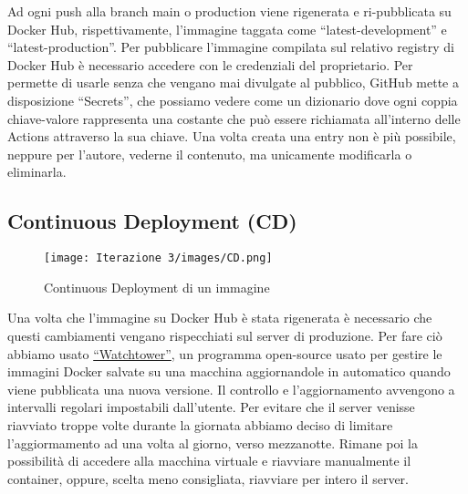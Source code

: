 Ad ogni push alla branch main o production viene rigenerata e ri-pubblicata su Docker Hub, rispettivamente, l'immagine taggata come ``latest-development'' e \\ ``latest-production''.
Per pubblicare l'immagine compilata sul relativo registry di Docker Hub è necessario accedere con le credenziali del proprietario. Per permette di usarle senza che vengano mai divulgate al pubblico, GitHub mette a disposizione ``Secrets'', che possiamo vedere come un dizionario dove ogni coppia chiave-valore rappresenta una costante che può essere richiamata all'interno delle Actions attraverso la sua chiave. Una volta creata una entry non è più possibile, neppure per l'autore, vederne il contenuto, ma unicamente modificarla o eliminarla.
\subsection{Continuous Deployment (CD)}
\begin{figure}[h!]
  \centering
  \texttt{[image: Iterazione 3/images/CD.png]}
  \caption{Continuous Deployment di un immagine}
\end{figure}
Una volta che l'immagine su Docker Hub è stata rigenerata è necessario che questi cambiamenti vengano rispecchiati sul server di produzione. Per fare ciò abbiamo usato  \href{https://containrrr.dev/watchtower/}{``Watchtower''}, un programma open-source usato per gestire le immagini Docker salvate su una macchina aggiornandole in automatico quando viene pubblicata una nuova versione. Il controllo e l'aggiornamento avvengono a intervalli regolari impostabili dall'utente. Per evitare che il server venisse riavviato troppe volte durante la giornata abbiamo deciso di limitare l'aggiormamento ad una volta al giorno, verso mezzanotte. Rimane poi la possibilità di accedere alla macchina virtuale e riavviare manualmente il container, oppure, scelta meno consigliata, riavviare per intero il server.
